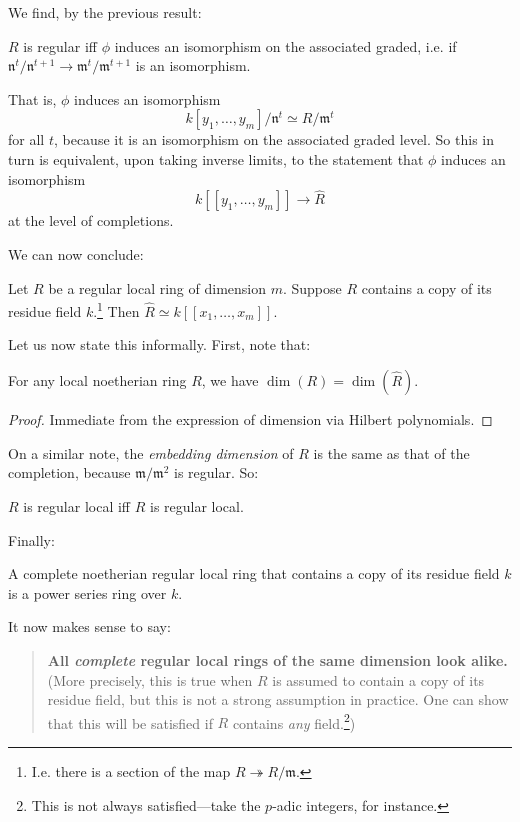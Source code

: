 We find, by the previous result:

\begin{proposition} 
$R$ is regular iff  $\phi$ induces an isomorphism on the associated graded,
i.e. if $\mathfrak{n}^t/\mathfrak{n}^{t+1} \to
\mathfrak{m}^t/\mathfrak{m}^{t+1}$ is an isomorphism.
\end{proposition} 

That is, $\phi$ induces an isomorphism
\[ k[y_1, \dots,y_m]/\mathfrak{n}^t \simeq R/\mathfrak{m}^t  \]
for all $t$, because it is an isomorphism on the associated graded level.
So this in turn is equivalent, upon taking inverse limits, to the statement that
$\phi$ induces an isomorphism
\[ k[[y_1, \dots, y_m ]] \to \hat{R} \]
at the level of completions.

We can now conclude:
\begin{theorem} 
Let $R$ be a regular local ring of dimension $m$. Suppose $R$ contains a copy
of its residue field $k$.\footnote{I.e. there is a section of the map $R
\twoheadrightarrow R/\mathfrak{m}$.} Then $\hat{R} \simeq k[[x_1, \dots, x_m]]$.
\end{theorem} 


Let us now state this informally. First, note that:
\begin{proposition} 
For any local noetherian ring $R$, we have $\dim(R) = \dim(\hat{R})$.
\end{proposition} 
\begin{proof} 
Immediate from the expression of dimension via Hilbert polynomials.
\end{proof} 

On a similar note, the \emph{embedding dimension} of $R$ is the same as that of
the completion, because $\mathfrak{m}/\mathfrak{m}^2$ is regular.
So:
\begin{proposition} 
$R$ is regular local iff $\hat{R}$ is regular local.
\end{proposition} 

Finally:
\begin{corollary} 
A complete noetherian regular local ring that contains a copy of its residue
field $k$ is a power series ring over $k$.
\end{corollary} 

It now makes sense to say:
\begin{quote}
\textbf{All \emph{complete} regular local rings of the same dimension look
alike.} (More precisely, this is true when $R$ is assumed to contain a copy of
its residue field, but this is not a strong assumption in practice. One can
show that this will be satisfied if $R$ contains \emph{any}
field.\footnote{This is not always satisfied---take the $p$-adic integers, for instance.})
\end{quote}

